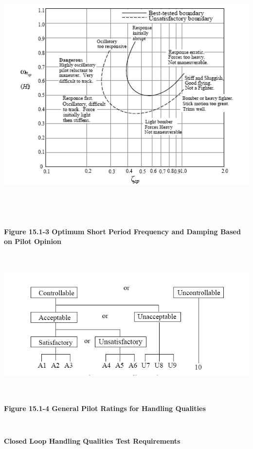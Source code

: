 \documentclass[
]{book}
\begin{document}
\includegraphics[width=6.5in,height=5.27431in]{media/15/image3.png}

\textbf{Figure 15.1-3 Optimum Short Period Frequency and Damping Based on Pilot Opinion}

\includegraphics[width=7in,height=3.03333in]{media/15/image4.png}

\textbf{Figure 15.1-4 General Pilot Ratings for Handling Qualities}

~

\textbf{Closed Loop Handling Qualities Test Requirements}
\end{document}
